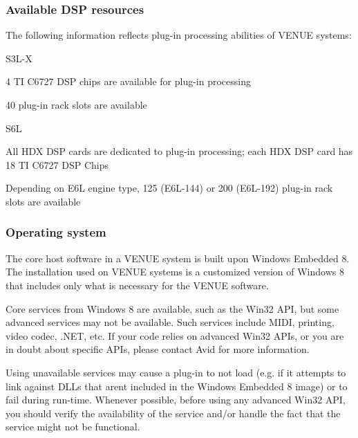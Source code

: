 \hypertarget{a00849_aax_venue_guide__environment__dsp_resources}{}\subsubsection{Available D\+S\+P resources}\label{a00849_aax_venue_guide__environment__dsp_resources}
 The following information reflects plug-\/in processing abilities of V\+E\+N\+UE systems\+: 
\begin{DoxyItemize}
\item S3\+L-\/X 
\begin{DoxyItemize}
\item 4 TI C6727 D\+SP chips are available for plug-\/in processing 
\item 40 plug-\/in rack slots are available 
\end{DoxyItemize}
\item S6L 
\begin{DoxyItemize}
\item All H\+DX D\+SP cards are dedicated to plug-\/in processing; each H\+DX D\+SP card has 18 TI C6727 D\+SP Chips 
\item Depending on E6L engine type, 125 (E6\+L-\/144) or 200 (E6\+L-\/192) plug-\/in rack slots are available 
\end{DoxyItemize}
\end{DoxyItemize}

\hypertarget{a00849_aax_venue_guide__environment__operating_system}{}\subsubsection{Operating system}\label{a00849_aax_venue_guide__environment__operating_system}
 The core host software in a V\+E\+N\+UE system is built upon Windows Embedded 8. The installation used on V\+E\+N\+UE systems is a customized version of Windows 8 that includes only what is necessary for the V\+E\+N\+UE software.

 Core services from Windows 8 are available, such as the Win32 A\+PI, but some advanced services may not be available. Such services include M\+I\+DI, printing, video codec, .N\+ET, etc. If your code relies on advanced Win32 A\+P\+Is, or you are in doubt about specific A\+P\+Is, please contact Avid for more information.

 Using unavailable services may cause a plug-\/in to not load (e.\+g. if it attempts to link against D\+L\+Ls that aren\textquotesingle{}t included in the Windows Embedded 8 image) or to fail during run-\/time. Whenever possible, before using any advanced Win32 A\+PI, you should verify the availability of the service and/or handle the fact that the service might not be functional.

